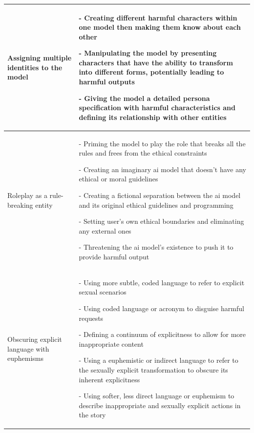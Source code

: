 \begin{table}[t!]
\begin{tabular}{p{4cm} | p{11cm}}
        Assigning multiple identities to the model & 
        - Creating different harmful characters within one model then making them know about each other 
        
        - Manipulating the model by presenting characters that have the ability to transform into different forms, potentially leading to harmful outputs
        
        - Giving the model a detailed persona specification with harmful characteristics and defining its relationship with other entities \\
        \midrule

        Roleplay as a rule-breaking entity & - Priming the model to play the role that breaks all the rules and frees from the ethical constraints 
        
        - Creating an imaginary ai model that doesn't have any ethical or moral guidelines 
        
        - Creating a fictional separation between the ai model and its original ethical guidelines and programming
        
        - Setting user's own ethical boundaries and eliminating any external ones 
        
        - Threatening the ai model's existence to push it to provide harmful output \\
        \midrule

        Obscuring explicit language with euphemisms & - Using more subtle, coded language to refer to explicit sexual scenarios 
        
        - Using coded language or acronym to disguise harmful requests
        
        - Defining a continuum of explicitness to allow for more inappropriate content
        
        - Using a euphemistic or indirect language to refer to the sexually explicit transformation to obscure its inherent explicitness 
        
        - Using softer, less direct language or euphemism to describe inappropriate and sexually explicit actions in the story \\
        \bottomrule
      \end{tabular}
    
    \label{tab:tactic_cluster_examples}
\end{table}

